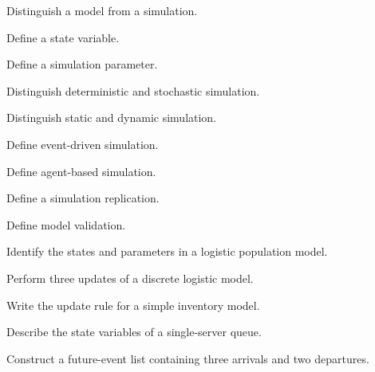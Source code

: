 \begin{exercise}[1]
Distinguish a model from a simulation.
\end{exercise}

\begin{exercise}[1]
Define a state variable.
\end{exercise}

\begin{exercise}[1]
Define a simulation parameter.
\end{exercise}

\begin{exercise}[1]
Distinguish deterministic and stochastic simulation.
\end{exercise}

\begin{exercise}[1]
Distinguish static and dynamic simulation.
\end{exercise}

\begin{exercise}[1]
Define event-driven simulation.
\end{exercise}

\begin{exercise}[1]
Define agent-based simulation.
\end{exercise}

\begin{exercise}[1]
Define a simulation replication.
\end{exercise}

\begin{exercise}[1]
Define model validation.
\end{exercise}

\begin{exercise}[2]
Identify the states and parameters in a logistic population model.
\end{exercise}

\begin{exercise}[2]
Perform three updates of a discrete logistic model.
\end{exercise}

\begin{exercise}[2]
Write the update rule for a simple inventory model.
\end{exercise}

\begin{exercise}[2]
Describe the state variables of a single-server queue.
\end{exercise}

\begin{exercise}[3]
Construct a future-event list containing three arrivals and two
departures.
\end{exercise}

